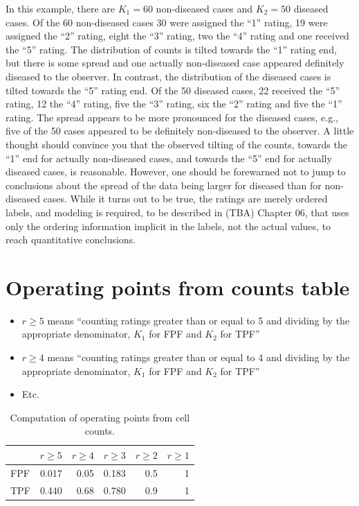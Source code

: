 \documentclass[
]{book}
\providecommand{\tightlist}{%
  \setlength{\itemsep}{0pt}\setlength{\parskip}{0pt}}
\begin{document}
In this example, there are \(K_1 = 60\) non-diseased cases and \(K_2 = 50\) diseased cases. Of the 60 non-diseased cases 30 were assigned the ``1'' rating, 19 were assigned the ``2'' rating, eight the ``3'' rating, two the ``4'' rating and one received the ``5'' rating. The distribution of counts is tilted towards the ``1'' rating end, but there is some spread and one actually non-diseased case appeared definitely diseased to the observer. In contrast, the distribution of the diseased cases is tilted towards the ``5'' rating end. Of the 50 diseased cases, 22 received the ``5'' rating, 12 the ``4'' rating, five the ``3'' rating, six the ``2'' rating and five the ``1'' rating. The spread appears to be more pronounced for the diseased cases, e.g., five of the 50 cases appeared to be definitely non-diseased to the observer. A little thought should convince you that the observed tilting of the counts, towards the ``1'' end for actually non-diseased cases, and towards the ``5'' end for actually diseased cases, is reasonable. However, one should be forewarned not to jump to conclusions about the spread of the data being larger for diseased than for non-diseased cases. While it turns out to be true, the ratings are merely ordered labels, and modeling is required, to be described in (TBA) Chapter 06, that uses only the ordering information implicit in the labels, not the actual values, to reach quantitative conclusions.

\hypertarget{operating-points-from-counts-table}{%
\section{Operating points from counts table}\label{operating-points-from-counts-table}}

\begin{itemize}
\tightlist
\item
  \(r\ge 5\) means ``counting ratings greater than or equal to 5 and dividing by the appropriate denominator, \(K_1\) for FPF and \(K_2\) for TPF''
\item
  \(r\ge 4\) means ``counting ratings greater than or equal to 4 and dividing by the appropriate denominator, \(K_1\) for FPF and \(K_2\) for TPF''
\item
  Etc.
\end{itemize}

\begin{table}

\caption{\label{tab:ratingsParadigmTable2}Computation of operating points from cell counts.}
\centering
\begin{tabular}[t]{l|r|r|r|r|r}
\hline
  & $r\ge 5$ & $r\ge 4$ & $r\ge 3$ & $r\ge 2$ & $r\ge 1$\\
\hline
FPF & 0.017 & 0.05 & 0.183 & 0.5 & 1\\
\hline
TPF & 0.440 & 0.68 & 0.780 & 0.9 & 1\\
\hline
\end{tabular}
\end{table}
\end{document}
